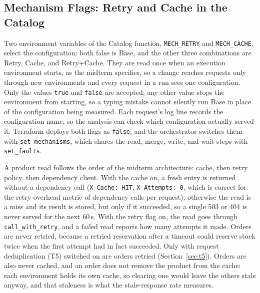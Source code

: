 \documentclass[10pt]{article}
\begin{document}
\subsection{Mechanism Flags: Retry and Cache in the Catalog}
Two environment variables of the Catalog function, \texttt{MECH\_RETRY} and
\texttt{MECH\_CACHE}, select the configuration: both false is Base, and the
other three combinations are Retry, Cache, and Retry+Cache. They are read once
when an execution environment starts, as the midterm specifies, so a change
reaches requests only through new environments and every request in a run sees
one configuration. Only the values \texttt{true} and \texttt{false} are
accepted; any other value stops the environment from starting, so a typing
mistake cannot silently run Base in place of the configuration being measured.
Each request's log line records the configuration name, so the analysis can
check which configuration actually served it. Terraform deploys both flags as
\texttt{false}, and the orchestrator switches them with
\texttt{set\_mechanisms}, which shares the read, merge, write, and wait steps
with \texttt{set\_faults}.

A product read follows the order of the midterm architecture: cache, then retry
policy, then dependency client. With the cache on, a fresh entry is returned
without a dependency call (\texttt{X-Cache: HIT}, \texttt{X-Attempts: 0}, which
is correct for the retry-overhead metric of dependency calls per request);
otherwise the read is a miss and its result is stored, but only if it
succeeded, so a single 503 or 404 is never served for the next 60\,s. With the
retry flag on, the read goes through \texttt{call\_with\_retry}, and a failed
read reports how many attempts it made. Orders are never retried, because a
retried reservation after a timeout could reserve stock twice when the first
attempt had in fact succeeded. Only with request deduplication (T5) switched
on are orders retried (Section~\ref{sec:t5}).
Orders are also never cached, and an order does not remove the product from the
cache: each environment holds its own cache, so clearing one would leave the
others stale anyway, and that staleness is what the stale-response rate
measures.
\end{document}
